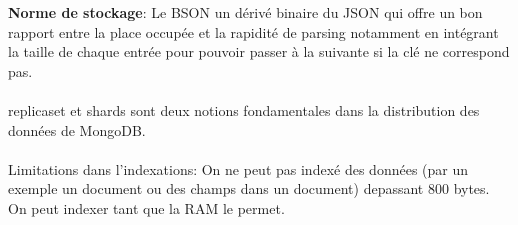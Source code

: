 \noindent \textbf{Norme de stockage}: Le \textsf{BSON} un dérivé binaire du \textsf{JSON} qui offre un bon rapport entre la place occupée et la rapidité de parsing notamment en intégrant la taille de chaque entrée pour pouvoir passer à la suivante si la clé ne correspond pas.
\\
\\
\textsf{replicaset et shards} sont deux notions fondamentales dans la distribution des données de MongoDB.
\\
\\
Limitations dans l'indexations:
On ne peut pas indexé des données (par un exemple un document ou des champs dans un document) depassant 800 bytes.
\\
On peut indexer tant que la RAM le permet.
